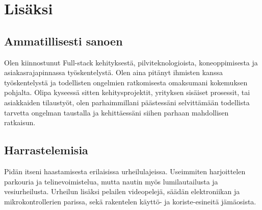\documentclass[letterpaper]{twentysecondcv}
\begin{document}

\section{Lisäksi}


\subsection{Ammatillisesti sanoen}

Olen kiinnostunut Full-stack kehityksestä, pilviteknologioista, koneoppimisesta ja asiakasrajapinnassa työskentelystä.
Olen aina pitänyt ihmisten kanssa työskentelystä ja todellisten ongelmien ratkomisesta omaksumani kokemuksen pohjalta.
Olipa kyseessä sitten kehitysprojektit, yrityksen sisäiset prosessit,
tai asiakkaiden tilaustyöt,
olen parhaimmillani päästessäni selvittämään todellista tarvetta ongelman taustalla
ja kehittäessäni siihen parhaan mahdollisen ratkaisun.

\subsection{Harrastelemisia}
	Pidän itseni haastamisesta erilaisissa urheilulajeissa.
	Useimmiten harjoittelen parkouria ja telinevoimistelua,
	mutta nautin myös lumilautailusta ja vesiurheilusta.
	Urheilun lisäksi pelailen videopelejä, säädän elektroniikan ja mikrokontrollerien parissa,
	sekä rakentelen käyttö- ja koriste-esineitä jämäosista.







\end{document}
